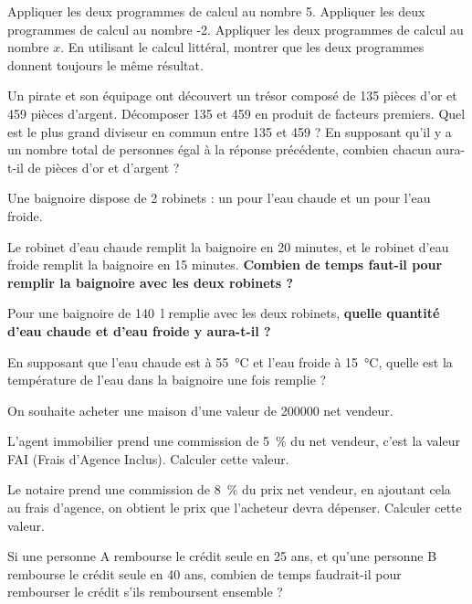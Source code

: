 \documentclass["../Cours.tex"]{subfiles}
\begin{document}
\begin{questions}
\question Appliquer les deux programmes de calcul au nombre 5.
\question Appliquer les deux programmes de calcul au nombre -2.
\question Appliquer les deux programmes de calcul au nombre $x$.
\question En utilisant le calcul littéral, montrer que les deux programmes donnent toujours le même résultat.


Un pirate et son équipage ont découvert un trésor composé de 135 pièces d'or et 459 pièces d'argent. 
\question Décomposer 135 et 459 en produit de facteurs premiers.
\question Quel est le plus grand diviseur en commun entre 135 et 459 ?
\question En supposant qu'il y a un nombre total de personnes égal à la réponse précédente, combien chacun aura-t-il de pièces d'or et d'argent ?

    Une baignoire dispose de 2 robinets : un pour l'eau chaude et un pour l'eau froide. 
    
    \question Le robinet d'eau chaude remplit la baignoire en 20 minutes, et le robinet d'eau froide remplit la baignoire en 15 minutes. \textbf{Combien de temps faut-il pour remplir la baignoire avec les deux robinets ?}

    \question Pour une baignoire de \qty{140}{\litre} remplie avec les deux robinets, \textbf{quelle quantité d'eau chaude et d'eau froide y aura-t-il ?}

    \question En supposant que l'eau chaude est à \qty{55}{\degreeCelsius} et l'eau froide à \qty{15}{\degreeCelsius}, quelle est la température de l'eau dans la baignoire une fois remplie ?



    On souhaite acheter une maison d'une valeur de \qty{200000}{\EURO} net vendeur.

    \question L'agent immobilier prend une commission de \qty{5}{\percent} du net vendeur, c'est la valeur FAI (Frais d'Agence Inclus). Calculer cette valeur.

    \question Le notaire prend une commission de \qty{8}{\percent} du prix net vendeur, en ajoutant cela au frais d'agence, on obtient le prix que l'acheteur devra dépenser. Calculer cette valeur.

    \question Si une personne A rembourse le crédit seule en 25 ans, et qu'une personne B rembourse le crédit seule en 40 ans, combien de temps faudrait-il pour rembourser le crédit s'ils remboursent ensemble ?

\end{questions}
\end{document}
